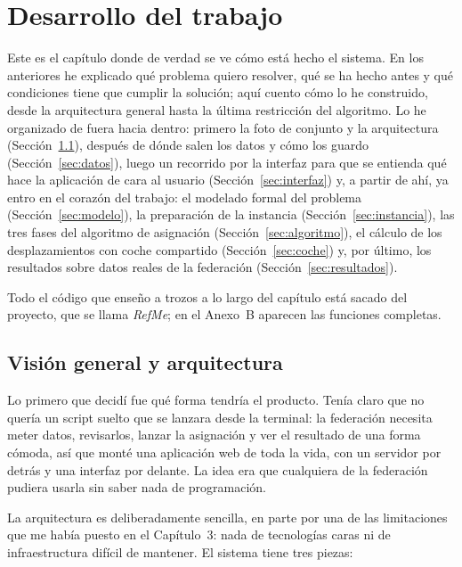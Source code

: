\documentclass[11pt,a4paper,spanish]{book}
\numberwithin{equation}{chapter}
\numberwithin{figure}{chapter}
\numberwithin{table}{chapter}
\begin{document}

\chapter{Desarrollo del trabajo}
\label{cap:desarrollo}

Este es el capítulo donde de verdad se ve cómo está hecho el sistema. En los anteriores he explicado qué problema quiero resolver, qué se ha hecho antes y qué condiciones tiene que cumplir la solución; aquí cuento cómo lo he construido, desde la arquitectura general hasta la última restricción del algoritmo. Lo he organizado de fuera hacia dentro: primero la foto de conjunto y la arquitectura (Sección~\ref{sec:arquitectura}), después de dónde salen los datos y cómo los guardo (Sección~\ref{sec:datos}), luego un recorrido por la interfaz para que se entienda qué hace la aplicación de cara al usuario (Sección~\ref{sec:interfaz}) y, a partir de ahí, ya entro en el corazón del trabajo: el modelado formal del problema (Sección~\ref{sec:modelo}), la preparación de la instancia (Sección~\ref{sec:instancia}), las tres fases del algoritmo de asignación (Sección~\ref{sec:algoritmo}), el cálculo de los desplazamientos con coche compartido (Sección~\ref{sec:coche}) y, por último, los resultados sobre datos reales de la federación (Sección~\ref{sec:resultados}).

Todo el código que enseño a trozos a lo largo del capítulo está sacado del proyecto, que se llama \emph{RefMe}; en el Anexo~B aparecen las funciones completas.

\section{Visión general y arquitectura}
\label{sec:arquitectura}

Lo primero que decidí fue qué forma tendría el producto. Tenía claro que no quería un script suelto que se lanzara desde la terminal: la federación necesita meter datos, revisarlos, lanzar la asignación y ver el resultado de una forma cómoda, así que monté una aplicación web de toda la vida, con un servidor por detrás y una interfaz por delante. La idea era que cualquiera de la federación pudiera usarla sin saber nada de programación.

La arquitectura es deliberadamente sencilla, en parte por una de las limitaciones que me había puesto en el Capítulo~3: nada de tecnologías caras ni de infraestructura difícil de mantener. El sistema tiene tres piezas:
\end{document}
